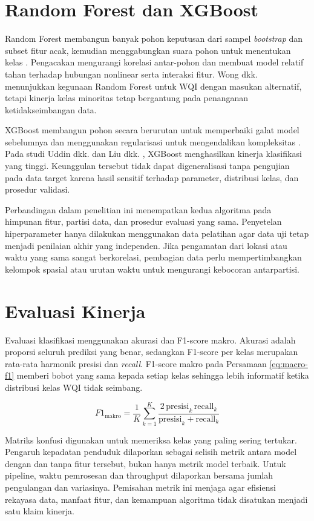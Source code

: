 \section{Random Forest dan XGBoost}

Random Forest membangun banyak pohon keputusan dari sampel \textit{bootstrap} dan subset fitur acak, kemudian menggabungkan suara pohon untuk menentukan kelas \cite{breiman_random_2001}. Pengacakan mengurangi korelasi antar-pohon dan membuat model relatif tahan terhadap hubungan nonlinear serta interaksi fitur. Wong dkk. \cite{wong_water_2022} menunjukkan kegunaan Random Forest untuk WQI dengan masukan alternatif, tetapi kinerja kelas minoritas tetap bergantung pada penanganan ketidakseimbangan data.

XGBoost membangun pohon secara berurutan untuk memperbaiki galat model sebelumnya dan menggunakan regularisasi untuk mengendalikan kompleksitas \cite{chen_xgboost_2016}. Pada studi Uddin dkk. \cite{uddin_performance_2023} dan Liu dkk. \cite{liu_wqi_2024}, XGBoost menghasilkan kinerja klasifikasi yang tinggi. Keunggulan tersebut tidak dapat digeneralisasi tanpa pengujian pada data target karena hasil sensitif terhadap parameter, distribusi kelas, dan prosedur validasi.

Perbandingan dalam penelitian ini menempatkan kedua algoritma pada himpunan fitur, partisi data, dan prosedur evaluasi yang sama. Penyetelan hiperparameter hanya dilakukan menggunakan data pelatihan agar data uji tetap menjadi penilaian akhir yang independen. Jika pengamatan dari lokasi atau waktu yang sama sangat berkorelasi, pembagian data perlu mempertimbangkan kelompok spasial atau urutan waktu untuk mengurangi kebocoran antarpartisi.

\section{Evaluasi Kinerja}

Evaluasi klasifikasi menggunakan akurasi dan F1-score makro. Akurasi adalah proporsi seluruh prediksi yang benar, sedangkan F1-score per kelas merupakan rata-rata harmonik presisi dan \textit{recall}. F1-score makro pada Persamaan \ref{eq:macro-f1} memberi bobot yang sama kepada setiap kelas sehingga lebih informatif ketika distribusi kelas WQI tidak seimbang.

\begin{equation}
    F1_{\mathrm{makro}}=\frac{1}{K}\sum_{k=1}^{K}
    \frac{2\,\mathrm{presisi}_k\,\mathrm{recall}_k}
    {\mathrm{presisi}_k+\mathrm{recall}_k}
    \label{eq:macro-f1}
\end{equation}

Matriks konfusi digunakan untuk memeriksa kelas yang paling sering tertukar. Pengaruh kepadatan penduduk dilaporkan sebagai selisih metrik antara model dengan dan tanpa fitur tersebut, bukan hanya metrik model terbaik. Untuk pipeline, waktu pemrosesan dan throughput dilaporkan bersama jumlah pengulangan dan variasinya. Pemisahan metrik ini menjaga agar efisiensi rekayasa data, manfaat fitur, dan kemampuan algoritma tidak disatukan menjadi satu klaim kinerja.
